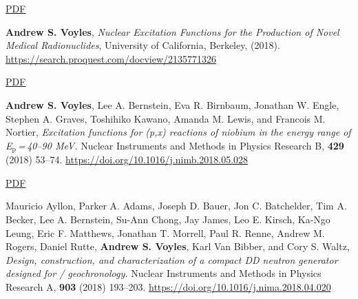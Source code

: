\begin{bibsection}
\ifshort \vspace{0.1cm} \href{https://avoyles.github.io/papers/Bernstein2019_NuclearData.pdf}{\underline{PDF}} \else  \fi 



\ifshort 
\item \textbf{Andrew S. Voyles}, \emph{Nuclear Excitation Functions for the Production of Novel Medical Radionuclides}, University of California, Berkeley, (2018). \url{https://search.proquest.com/docview/2135771326}
\else  \fi 


\ifshort \vspace{0.1cm} \href{https://avoyles.github.io/papers/ASV_Dissertation.pdf}{\underline{PDF}} \else  \fi 


\item \textbf{Andrew S. Voyles}, Lee A. Bernstein, Eva R. Birnbaum, Jonathan W. Engle, Stephen A. Graves, Toshihiko Kawano, Amanda M. Lewis, and Francois M. Nortier, \emph{Excitation functions for (p,x) reactions of niobium in the energy range of  E$_{\text{p}}$\,=\,40--90 MeV.} Nuclear Instruments and Methods in Physics Research  B, 
\textbf{429} (2018) 53--74. \url{https://doi.org/10.1016/j.nimb.2018.05.028} 


  
\ifshort \vspace{0.1cm} \href{https://avoyles.github.io/papers/Voyles2018_Nb_px.pdf}{\underline{PDF}} \else  \fi 
    
    

\item Mauricio Ayllon, Parker A. Adams, Joseph D. Bauer, Jon C. Batchelder, Tim A. Becker, Lee A. Bernstein, Su-Ann Chong, Jay James, Leo E. Kirsch, Ka-Ngo Leung, Eric F. Matthews, Jonathan T. Morrell, Paul R. Renne, Andrew M. Rogers, Daniel Rutte, \textbf{Andrew S. Voyles}, Karl Van Bibber, and Cory S. Waltz, \emph{Design, construction, and characterization of a compact DD neutron generator designed for / geochronology.} Nuclear Instruments and Methods in Physics Research  A, 
\textbf{903} (2018) 193--203. \url{https://doi.org/10.1016/j.nima.2018.04.020} 


\end{bibsection}

